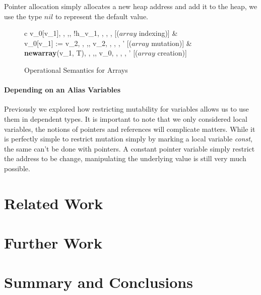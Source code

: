 \documentclass[a4paper,12pt]{report}
\begin{document}
\par
Pointer allocation simply allocates a new heap address and add it to the heap, 
we use the type $nil$ to represent the default value. 


\begin{figure}[H]
  \begin{center}
    \begin{tabular} {c}
        {\langle v_0[v_1], \sigma, \rho,\tau,\Delta \rangle 
          \longrightarrow \langle !h_{v_1}, \sigma, \rho, \tau, \Delta \rangle} [($array$ indexing)]
      & \\
        {\langle v_0[v_1] := v_2, \sigma, \rho,\tau,\Delta \rangle 
          \longrightarrow \langle v_2, \sigma, \rho, \tau, \Delta' \rangle} [($array$ mutation)]
     & \\
        {\langle \textbf{newarray}(v_1, T), \sigma, \rho,\tau,\Delta \rangle 
          \longrightarrow \langle v_0, \sigma, \rho, \tau, \Delta' \rangle} [($array$ creation)]
    \end{tabular}
  \end{center}
  \caption{Operational Semantics for Arrays}
\end{figure}


\subsubsection{Depending on an Alias Variables}
Previously we explored how restricting mutability for variables allows us to use 
them in dependent types. It is important to note that we only considered 
local variables, the notions of pointers and references will complicate matters. 
While it is perfectly simple to restrict mutation simply by marking a local 
variable \textit{const}, the same can't be done with pointers. A constant 
pointer variable simply restrict the address to be change, manipulating the 
underlying value is still very much possible. 





\chapter{Related Work}

\chapter{Further Work}

\chapter{Summary and Conclusions} 


\appendix
\singlespacing

\printbibliography
\end{document}

